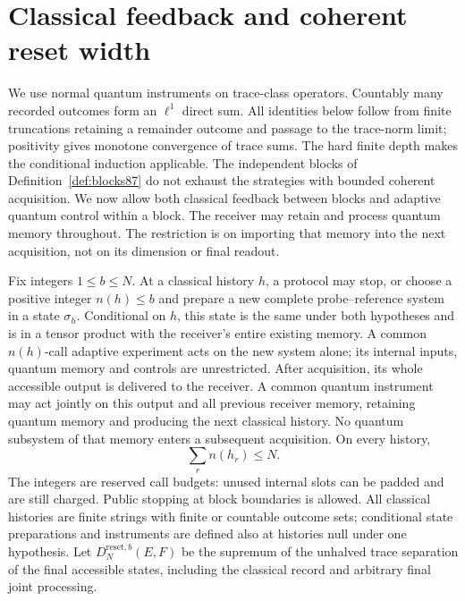 \section{Classical feedback and coherent reset width}
\label{sec:reset88}
We use normal quantum instruments on trace-class operators.  Countably
many recorded outcomes form an $\ell^1$ direct sum.  All identities below
follow from finite truncations retaining a remainder outcome and passage
to the trace-norm limit; positivity gives monotone convergence of trace
sums.  The hard finite depth makes the conditional induction applicable.
The independent blocks of Definition~\ref{def:blocks87} do not
exhaust the strategies with bounded coherent acquisition.  We now
allow both classical feedback between blocks and adaptive quantum
control within a block.  The receiver may retain and process quantum
memory throughout.  The restriction is on importing that memory
into the next acquisition, not on its dimension or final readout.

\begin{definition}\label{def:reset88}
Fix integers $1\le b\le N$.  At a classical history $h$, a protocol
may stop, or choose a positive integer $n(h)\le b$ and prepare a new
complete probe--reference system in a state $\sigma_h$.  Conditional
on $h$, this state is the same under both hypotheses and is in a
tensor product with the receiver's entire existing memory.  A common
$n(h)$-call adaptive experiment acts on the new system alone; its
internal inputs, quantum memory and controls are unrestricted.
After acquisition, its whole accessible output is delivered to the
receiver.  A common quantum instrument may act jointly on this
output and all previous receiver memory, retaining quantum memory
and producing the next classical history.  No quantum subsystem of
that memory enters a subsequent acquisition.  On every history,
\[
 \sum_r n(h_r)\le N.
\]
The integers are reserved call budgets: unused internal slots can
be padded and are still charged.  Public stopping at block boundaries
is allowed.  All classical histories are finite strings with finite
or countable outcome sets; conditional state preparations and
instruments are defined also at histories null under one hypothesis.
Let $D_N^{\mathrm{reset},b}(E,F)$ be the supremum of the unhalved
trace separation of the final accessible states, including the
classical record and arbitrary final joint processing.
\end{definition}

